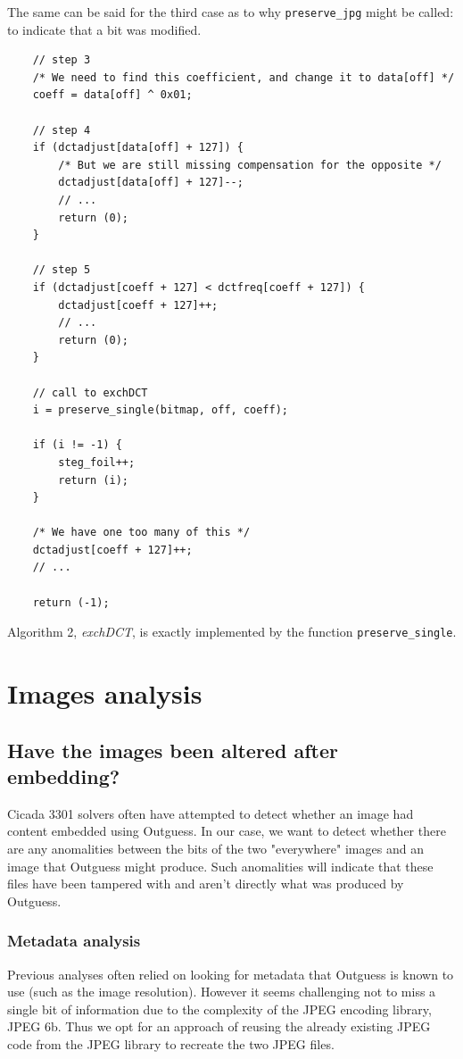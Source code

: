 \documentclass{article}
\begin{document}
The same can be said for the third case as to why \texttt{preserve\_jpg} might be called: to indicate that a bit was modified.
\begin{verbatim}
	// step 3
	/* We need to find this coefficient, and change it to data[off] */
	coeff = data[off] ^ 0x01;

	// step 4
	if (dctadjust[data[off] + 127]) {
		/* But we are still missing compensation for the opposite */
		dctadjust[data[off] + 127]--;
		// ...
		return (0);
	}
	
	// step 5
	if (dctadjust[coeff + 127] < dctfreq[coeff + 127]) {
		dctadjust[coeff + 127]++;
		// ...
		return (0);
	}
	
	// call to exchDCT
	i = preserve_single(bitmap, off, coeff);
	
	if (i != -1) {
		steg_foil++;
		return (i);
	}
	
	/* We have one too many of this */
	dctadjust[coeff + 127]++;
	// ...
	
	return (-1);
\end{verbatim}

Algorithm 2, \textit{exchDCT}, is exactly implemented by the function \texttt{preserve\_single}.

\section{Images analysis}

\subsection{Have the images been altered after embedding?}

Cicada 3301 solvers often have attempted to detect whether an image had content embedded using Outguess. In our case, we want to detect whether there are any anomalities between the bits of the two "everywhere" images and an image that Outguess might produce. Such anomalities will indicate that these files have been tampered with and aren't directly what was produced by Outguess.

\subsubsection{Metadata analysis}

Previous analyses often relied on looking for metadata that Outguess is known to use (such as the image resolution). However it seems challenging not to miss a single bit of information due to the complexity of the JPEG encoding library, JPEG 6b. Thus we opt for an approach of reusing the already existing JPEG code from the JPEG library to recreate the two JPEG files.
\end{document}
